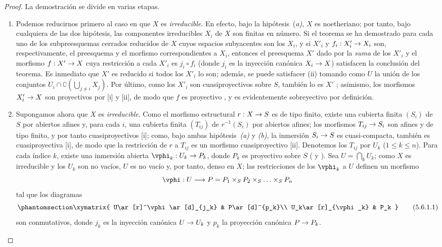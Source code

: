 \documentclass[oneside,10pt]{amsart}
\makeatletter
\renewcommand{\leq}{\leqslant}
\newcommand{\ega@arrow}[2]{\mathchoice{#1}{#2}{#2}{#2}}
\renewcommand{\to}{\ega@arrow{\longrightarrow}{\rightarrow}}
\newcommand{\oldpage}[2][]{\marginnote{\normalfont\footnotesize\textbf{#1}~|~#2}\ignorespaces}
\let\EGAOriginalLabel\label
\renewcommand{\label}[1]{\phantomsection\EGAOriginalLabel{#1}}
\makeatother
\begin{document}
\begin{proof}
La demostración se divide en varias etapas.
\begin{enumerate}
  \item[(A)] Podemos reducirnos primero al caso en que $X$ es \emph{irreducible}.
    En efecto, bajo la hipótesis~(\emph{a)}, $X$ es noetheriano; por tanto, bajo cualquiera de las dos hipótesis, las componentes irreducibles $X_i$ de $X$ son finitas en número.
    Si el teorema se ha demostrado para cada uno de los subpreesquemas cerrados reducidos de $X$ cuyos espacios subyacentes son los $X_i$, y si $X'_i$ y $f_i:X'_i\to X_i$ son, respectivamente, el preesquema y el morfismo correspondientes a $X_i$, entonces el preesquema $X'$ dado por la \emph{suma} de los $X'_i$ y el morfismo $f:X'\to X$ cuya restricción a cada $X'_i$ es $j_i\circ f_i$ (donde $j_i$ es la inyección canónica $X_i\to X$) satisfacen la conclusión del teorema.
    Es inmediato que $X'$ es reducido si todos los $X'_i$ lo son; además, se puede satisfacer (ii) tomando como $U$ la unión de los conjuntos $U_i\cap\complement\left(\bigcup_{j\neq i}X_j\right)$.
    Por último, como los $X'_i$ son cuasiproyectivos sobre $S$, también lo es $X'$
\oldpage[II]{107}
    ; asimismo, los morfismos $X'_i\to X$ son proyectivos por [i] y [ii], de modo que $f$ es proyectivo , y es evidentemente sobreyectivo por definición.

  \item[(B)] Supongamos ahora que $X$ es \emph{irreducible}.
    Como el morfismo estructural $r:X\to S$ es de tipo finito, existe una cubierta finita $(S_i)$ de $S$ por abiertos afines y, para cada $i$, una cubierta finita $(T_{ij})$ de $r^{-1}(S_i)$ por abiertos afines; los morfismos $T_{ij}\to S_i$ son afines y de tipo finito, y por tanto cuasiproyectivos [i];
    como, bajo ambas hipótesis~\emph{(a)} y \emph{(b)}, la inmersión $S_i\to S$ es cuasi-compacta, también es cuasiproyectiva [i], de modo que la restricción de $r$ a $T_{ij}$ es un morfismo cuasiproyectivo [ii].
    Denotemos los $T_{ij}$ por $U_k$ ($1\leq k\leq n$).
    Para cada índice $k$, existe una inmersión abierta $\vphi_k:U_k\to P_k$, donde $P_k$ es proyectivo sobre $S$ ( y ).
    Sea $U=\bigcap_k U_k$; como $X$ es irreducible y los $U_k$ son no vacíos, $U$ es no vacío y, por tanto, denso en $X$; las restricciones de los $\vphi_k$ a $U$ definen un morfismo
    \[
      \vphi:U\to P=P_1\times_S P_2\times_S\ldots\times_S P_n
    \]
    tal que los diagramas
    \[
    \label{II.5.6.1.1}
      \xymatrix{
        U\ar[r]^\vphi\ar[d]_{j_k} &
        P\ar[d]^{p_k}\\
        U_k\ar[r]_{\vphi_k} &
        P_k
      }
      \tag{5.6.1.1}
    \]
    son conmutativos, donde $j_k$ es la inyección canónica $U\to U_k$ y $p_k$ la proyección canónica $P\to P_k$.


\end{enumerate}
\end{proof}
\end{document}

